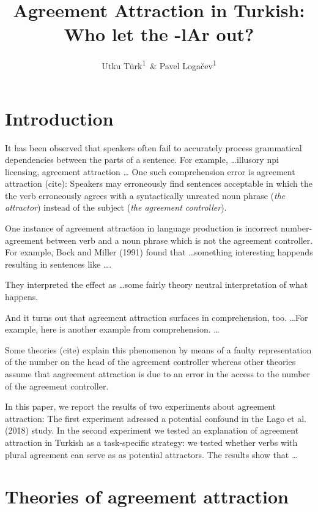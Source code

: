 \documentclass[doc]{apa6}
\title{Agreement Attraction in Turkish: Who let the -lAr out?}
\author{Utku Türk\textsuperscript{1}~\& Pavel Logačev\textsuperscript{1}}
\date{}
\begin{document}
\maketitle

\section*{Introduction}

It has been observed that speakers often fail to accurately process grammatical dependencies between the parts of a sentence.
For example, \ldots illusory npi licensing, agreement attraction \ldots
One such comprehension error is agreement attraction (cite): Speakers may erroneously find sentences acceptable in which the the verb erroneously agrees with a syntactically unreated noun phrase (\emph{the attractor}) instead of the subject (\emph{the agreement controller}).

One instance of agreement attraction in language production is incorrect number-agreement between verb and a noun phrase which is not the agreement controller. For example, Bock and Miller (1991) found
that \ldots something interesting happends resulting in sentences like \ldots.

\begin{exe}
\label{AAEx1}
\end{exe}

They interpreted the effect as \ldots some fairly theory neutral interpretation of what happens.

And it turns out that agreement attraction surfaces in comprehension, too. \ldots For example, here is another example from comprehension. \ldots 

Some theories (cite) explain this phenomenon by means of a faulty representation of the number on the head of the agreement controller whereas other theories assume that aagreement attraction is due to an error in the access to the number of the agreement controller.

In this paper, we report the results of two experiments about agreement attraction: The first experiment adressed a potential confound in the Lago et al. (2018) study. In the second experiment we tested an explanation of agreement attraction in Turkish as a task-specific strategy: we tested whether verbs with plural agreement can serve as as potential attractors.
The results show that \ldots 

\hypertarget{theories-of-agreement-attraction}{%
\section{Theories of agreement attraction}\label{theories-of-agreement-attraction}}
\end{document}
